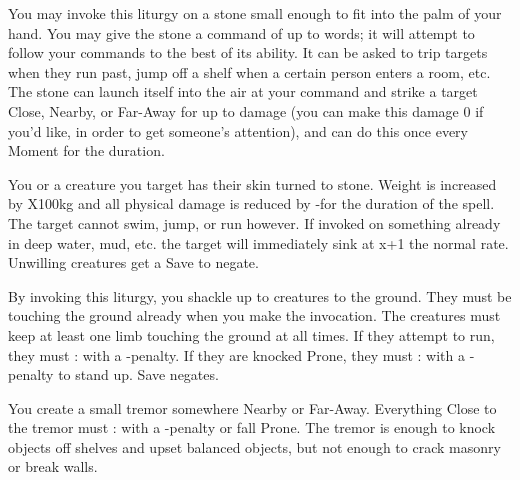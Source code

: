{You may invoke this liturgy on a stone small enough to fit into the palm of your hand.  You may give the stone a command of up to \DICE words; it will attempt to follow your commands to the best of its ability.  It can be asked to trip targets when they run past, jump off a shelf when a certain person enters a room, etc.  The stone can launch itself into the air at your command and strike a target Close, Nearby, or Far-Away for up to \DICE damage (you can make this damage 0 if you'd like, in order to get someone's attention), and can do this once every Moment for the duration.

\LITURGY [
  Name= Stoneskin,
  Link=raimonds-liturgy-stoneskin,
  Paradigm= Biomancy ,
  Save=  Y (negates) ,
  Duration= Combat or \SUMDICE Minutes ,
  Counter=  n/a  ,
  Keywords= None ,
  Target=   Self or Close creature
]



You or a creature you target has their skin turned to stone.  Weight is increased by \DICE X100kg and all physical damage is reduced by -\DICE for the duration of the spell.  The target cannot swim, jump, or run however. If invoked on something already in deep water, mud, etc. the target will immediately sink at x\DICE+1 the normal rate. Unwilling creatures get a Save to negate. 

\LITURGY [
  Name= Terrestrial Shackle,
  Link=raimonds-liturgy-terrestrial-shackle,
  Paradigm= Elements ,
  Save=  Y (negates) ,
  Duration= Markovian ,
  Counter=  n/a  ,
  Keywords= Splittable ,
  Target=   Close; Nearby; or Far-Away creatures
]



By invoking this liturgy, you shackle up to \DICE creatures to the ground.  They must be touching the ground already when you make the invocation.  The creatures must keep at least one limb touching the ground at all times.  If they attempt to run, they must \RB : \DEX with a -\DICE penalty.  If they are knocked Prone, they must \RB : \VIG with a -\DICE penalty to stand up.  Save negates.

\LITURGY [
  Name= Tremor,
  Link=raimonds-liturgy-tremor,
  Paradigm= Elements ,
  Save=  N ,
  Duration= 0 ,
  Counter=  n/a  ,
  Keywords= Contested ,
  Target=   Nearby or Far Away point
]



You create a small tremor somewhere Nearby or Far-Away.  Everything Close to the tremor must \RB : \DEX with a -\DICE penalty or fall Prone.  The tremor is enough to knock objects off shelves and upset balanced objects, but not enough to crack masonry or break walls.



}
